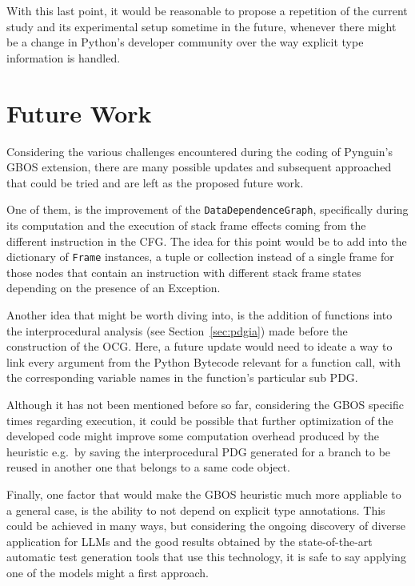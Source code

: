 \documentclass[%
  chapterprefix=false,%
  open=right,%
  twoside=true,%
  paper=a4,%
  logofile={Figures/logo.png},%
  thesistype=master,%
  UKenglish,%
]{se2thesis}
\newcommand{\classname}[1]{\texttt{#1}}
\begin{document}
With this last point, it would be reasonable to propose a repetition of the current study and its experimental setup sometime in the future, whenever there might be a change in Python's developer community over the way explicit type information is handled. 

\section{Future Work}

Considering the various challenges encountered during the coding of Pynguin's GBOS extension, there are many possible updates and subsequent approached that could be tried and are left as the proposed future work.

One of them, is the improvement of the \classname{DataDependenceGraph}, specifically during its computation and the execution of stack frame effects coming from the different instruction in the CFG.\@
The idea for this point would be to add into the dictionary of \classname{Frame} instances, a tuple or collection instead of a single frame for those nodes that contain an instruction with different stack frame states depending on the presence of an Exception.

Another idea that might be worth diving into, is the addition of functions into the interprocedural analysis (see Section~\ref{sec:pdgia}) made before the construction of the OCG.\@
Here, a future update would need to ideate a way to link every argument from the Python Bytecode relevant for a function call, with the corresponding variable names in the function's particular sub PDG.\@

Although it has not been mentioned before so far, considering the GBOS specific times regarding execution, it could be possible that further optimization of the developed code might improve some computation overhead produced by the heuristic e.g.~by saving the interprocedural PDG generated for a branch to be reused in another one that belongs to a same code object.

Finally, one factor that would make the GBOS heuristic much more appliable to a general case, is the ability to not depend on explicit type annotations.
This could be achieved in many ways, but considering the ongoing discovery of diverse application for LLMs and the good results obtained by the state-of-the-art automatic test generation tools that use this technology, it is safe to say applying one of the models might a first approach.

\backmatter{}

\printbibliography{}
\end{document}
